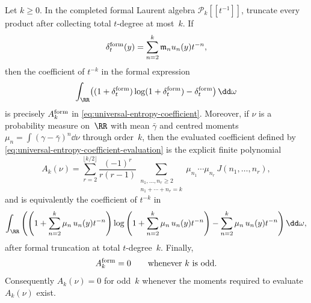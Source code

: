 \begin{theorem}%
\label{thm:universal-entropy-coefficients}
Let $k\ge0$.  In the completed formal Laurent algebra
$\mathcal P_k[[t^{-1}]]$, truncate every product after collecting total
$t$-degree at most~$k$.  If
\[
\delta^{\rm form}_t(y)=\sum_{n=2}^{k}\mathfrak m_n u_n(y)t^{-n},
\]
then the coefficient of $t^{-k}$ in the formal expression
\[
\int_{\RR}\bigl((1+\delta^{\rm form}_t)\log(1+\delta^{\rm form}_t)
-\delta^{\rm form}_t\bigr)\,\dd\omega
\]
is precisely $A_k^{\rm form}$ in
\eqref{eq:universal-entropy-coefficient}.  Moreover, if $\nu$ is a
probability measure on~$\RR$ with mean $\bar{\gamma}$ and centred moments
$\mu_n=\int(\gamma-\bar{\gamma})^n\dd\nu$ through order~$k$, then the evaluated
coefficient defined by \eqref{eq:universal-entropy-coefficient-evaluation} is
the explicit finite polynomial
\begin{equation}\label{eq:universal-coefficient-theorem-evaluated}
A_k(\nu)
=
\sum_{r=2}^{\lfloor k/2\rfloor}
\frac{(-1)^r}{r(r-1)}
\sum_{\substack{n_1,\dots,n_r\ge2\\ n_1+\cdots+n_r=k}}
\mu_{n_1}\cdots\mu_{n_r}\,J(n_1,\dots,n_r),
\end{equation}
and is equivalently the coefficient of $t^{-k}$ in
\begin{equation}\label{eq:universal-coefficient-theorem-generating}
\int_{\RR}
\left(
\left(1+\sum_{n=2}^{k}\mu_n\,u_n(y)t^{-n}\right)
\log\left(1+\sum_{n=2}^{k}\mu_n\,u_n(y)t^{-n}\right)
-\sum_{n=2}^{k}\mu_n\,u_n(y)t^{-n}
\right)\dd\omega,
\end{equation}
after formal truncation at total $t$-degree~$k$.  Finally,
\begin{equation}\label{eq:universal-odd-coefficients-vanish}
A_k^{\rm form}=0\qquad\text{whenever }k\text{ is odd}.
\end{equation}
Consequently $A_k(\nu)=0$ for odd~$k$ whenever the moments required to evaluate
$A_k(\nu)$ exist.
\end{theorem}

